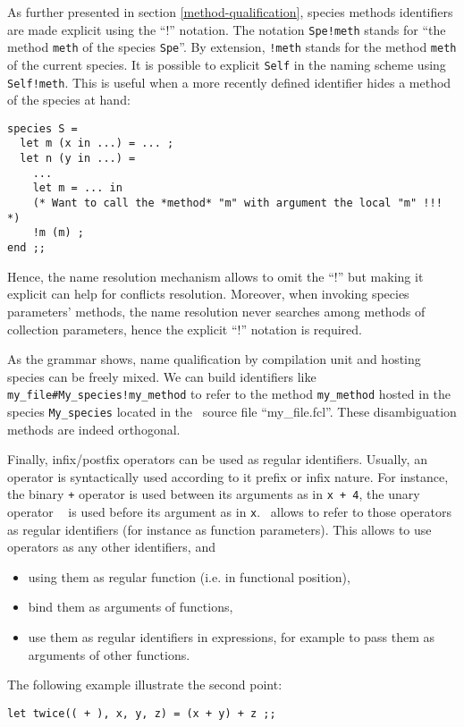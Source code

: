 \medskip {} As further presented in section
\ref{method-qualification}, species methods identifiers are made
explicit using the ``!'' notation. The notation {\tt Spe!meth} stands
for ``the method {\tt meth} of the species {\tt Spe}''. By extension,
{\tt !meth} stands for the method {\tt meth} of the current
species. It is possible to explicit {\tt Self} in the naming scheme
using {\tt Self!meth}. This is useful when a more recently defined
identifier hides a method of the species at hand: {\scriptsize
\begin{lstlisting}
species S =
  let m (x in ...) = ... ;
  let n (y in ...) =
    ...
    let m = ... in
    (* Want to call the *method* "m" with argument the local "m" !!! *)
    !m (m) ;
end ;;
\end{lstlisting}
}

Hence, the name resolution mechanism allows to omit the ``!'' but
making it explicit can help for conflicts resolution. Moreover, when
invoking species parameters' methods, the name resolution never
searches among methods of collection parameters, hence the explicit ``!''
notation is required.

As the grammar shows, name qualification by compilation unit and
hosting species can be freely mixed. We can build identifiers like
{\tt my\_file\#My\_species!my\_method} to refer to the method
{\tt my\_method} hosted in the species {\tt My\_species} located in
the \focal\ source file ``my\_file.fcl''. These disambiguation
methods are indeed orthogonal.



\medskip
{}

Finally, infix/postfix operators can be used as regular
identifiers. Usually, an operator is syntactically used according to
it prefix or infix nature. For instance, the binary {\tt +} operator
is used between its arguments as in {\tt x + 4}, the unary operator {\tt
  \tilde} is used before its argument as in {\tt \tilde x}. \focal\ allows to
refer to those operators as regular identifiers (for instance as function
parameters).
This allows to use operators as any other identifiers, and
\begin{itemize}
  \item using them as regular function (i.e. in functional position),
  \item bind them as arguments of functions,
  \item use them as regular identifiers in expressions, for example to
    pass them as arguments of other functions.
\end{itemize}
The following example illustrate the second point:
\begin{lstlisting}
let twice(( + ), x, y, z) = (x + y) + z ;;
\end{lstlisting}

